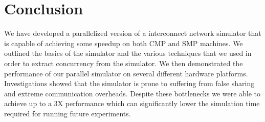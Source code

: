 \documentclass[twocolumn]{article}
\begin{document}
\section{Conclusion \label{conc}}
We have developed a parallelized version of a interconnect network
simulator that is capable of achieving some speedup on both CMP and SMP
machines.  We outlined the basics of the simulator and the various
techniques that we used in order to extract concurrency from the
simulator.  We then demonstrated the performance of our parallel simulator
on several different hardware platforms.  Investigations showed that the
simulator is prone to suffering from false sharing and extreme
communication overheads.  Despite these bottlenecks we were able to
achieve up to a 3X performance which can significantly lower the
simulation time required for running future experiments.







\end{document}
